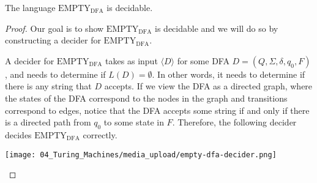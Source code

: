 \begin{flex}
\begin{theorem} \label{theorem:textEMPTY-textDFA-is-decidable}
The language $\mathrm{EMPTY}_\mathrm{DFA}$ is decidable.
\end{theorem}

\begin{proof}
Our goal is to show $\mathrm{EMPTY}_\mathrm{DFA}$ is decidable and we will do so by constructing a decider for $\mathrm{EMPTY}_\mathrm{DFA}$. 

A decider for $\mathrm{EMPTY}_\mathrm{DFA}$ takes as input $\langle D \rangle$ for some DFA $D = (Q, \Sigma, \delta, q_0, F)$, and needs to determine if $L(D) = \emptyset$. In other words, it needs to determine if there is any string that $D$ accepts. If we view the DFA as a directed graph, where the states of the DFA correspond to the nodes in the graph and transitions correspond to edges, notice that the DFA accepts some string if and only if there is a directed path from $q_0$ to some state in $F$. Therefore, the following decider decides $\mathrm{EMPTY}_\mathrm{DFA}$ correctly.
\begin{center}
    \texttt{[image: 04\_Turing\_Machines/media\_upload/empty-dfa-decider.png]}
\end{center}
\end{proof}
\end{flex}


